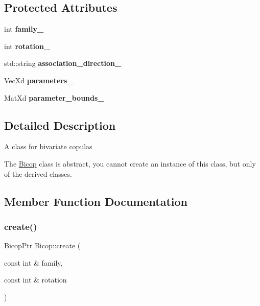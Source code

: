 \subsection*{Protected Attributes}
\begin{DoxyCompactItemize}
\item 
\mbox{\label{class_bicop_a3d546f9b8c6507002cae18b9fdcb4544}} 
int {\bfseries family\+\_\+}
\item 
\mbox{\label{class_bicop_a606833e2ea1d17a318dd20d67d01b40a}} 
int {\bfseries rotation\+\_\+}
\item 
\mbox{\label{class_bicop_a407914da267317da3f588632e4b95aa3}} 
std\+::string {\bfseries association\+\_\+direction\+\_\+}
\item 
\mbox{\label{class_bicop_ade78fec591e6699a808b63104709b23a}} 
Vec\+Xd {\bfseries parameters\+\_\+}
\item 
\mbox{\label{class_bicop_a036757929bd08168373f316a94c1af59}} 
Mat\+Xd {\bfseries parameter\+\_\+bounds\+\_\+}
\end{DoxyCompactItemize}


\subsection{Detailed Description}
A class for bivariate copulas

The \hyperlink{class_bicop}{Bicop} class is abstract, you cannot create an instance of this class, but only of the derived classes. 

\subsection{Member Function Documentation}
\mbox{\label{class_bicop_acb60163725518f4ccfd7694272014686}} 
\subsubsection{\texorpdfstring{create()}{create()}\hspace{0.1cm}{\footnotesize\ttfamily [1/2]}}
{\footnotesize\ttfamily Bicop\+Ptr Bicop\+::create (\begin{DoxyParamCaption}\item[{const int \&}]{family,  }\item[{const int \&}]{rotation }\end{DoxyParamCaption})\hspace{0.3cm}{\ttfamily [static]}}

